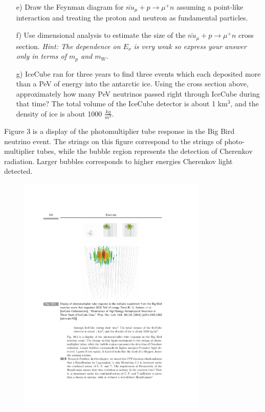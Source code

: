 {\begin{itemize}
{\textit{This property of the scattering angle from part is extremely important for determining the astrophysical source of the high energy neutrinos observed in IceCube. 
In 2016, scientists on the Fermi Gamma Ray Space Telescope found evidence that the neutrino that was responsible for the Big Bird muon was created in a blazar, an enormously energetic radiation source believed to be generated by a supermassive black hole at the center of a galaxy.}
}
\item[e)]{Draw the Feynman diagram for $\bar{nu}_\mu + p \rightarrow \mu^+ n $ assuming a point-like interaction and treating the proton and neutron as fundamental particles.}
\item[f)]{Use dimensional analysis to estimate the size of the $\bar{nu}_\mu + p \rightarrow \mu^+ n $ cross section. \textit{Hint: The dependence on $E_\nu$ is very weak so express your answer only in terms of $m_p$ and $m_W$.}
}
\item[g)]{
IceCube ran for three years to find three events which each deposited more than a PeV of energy into the antarctic ice. 
Using the cross section above, approximately how many PeV neutrinos passed right through IceCube during that time? 
The total volume of the IceCube detector is about 1 km$^3$, and the density of ice is about 1000 $\frac{kg}{m^3}$.
}
\end{itemize}

Figure 3 is a display of the photomultiplier tube response in the Big Bird neutrino event. 
The strings on this figure correspond to the strings of photo-multiplier tubes, while the bubble region represents the detection of Cherenkov radiation.
 Larger bubbles corresponds to higher energies Cherenkov light detected. 

\begin{figure}[h!]
\centering
\includegraphics[width=0.8\textwidth]{./IceCubeBigBird.pdf}
\caption{}
\end{figure}


}
